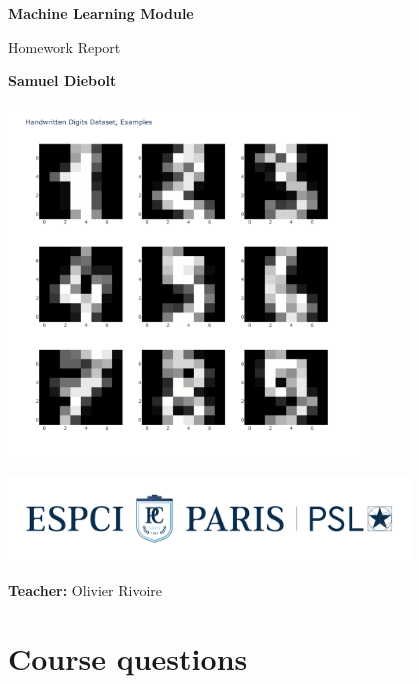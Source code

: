 \documentclass[12pt]{article}
\begin{document}
  \begin{titlepage}
    \begin{center}
      \vspace*{1cm}
 
      \Huge
      \textbf{Machine Learning Module}
 
      \vspace{0.5cm}
      \LARGE
      Homework Report
 
      \vspace{1.5cm}
 
      \textbf{Samuel Diebolt}

      \vspace{0.8cm}
 
      \includegraphics[width=0.7\textwidth]{readdigits}
 
      \vspace{0.8cm}

      \includegraphics[width=0.8\textwidth]{espci_logo}
 
      \Large
      \textbf{Teacher:} Olivier Rivoire
    \end{center}
    \thispagestyle{empty}
  \end{titlepage}

  \section{Course questions}
\end{document}
